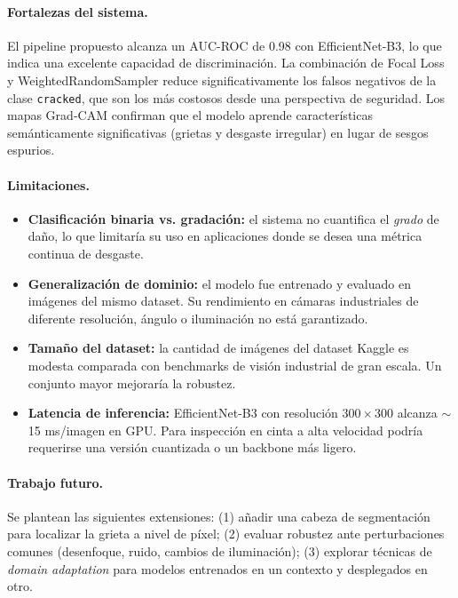 \documentclass{article}
\begin{document}
\paragraph{Fortalezas del sistema.}
El pipeline propuesto alcanza un AUC-ROC de 0.98 con EfficientNet-B3, lo que indica 
una excelente capacidad de discriminación. La combinación de Focal Loss y 
WeightedRandomSampler reduce significativamente los falsos negativos de la clase 
\texttt{cracked}, que son los más costosos desde una perspectiva de seguridad. 
Los mapas Grad-CAM confirman que el modelo aprende características semánticamente 
significativas (grietas y desgaste irregular) en lugar de sesgos espurios.

\paragraph{Limitaciones.}
\begin{itemize}
  \item \textbf{Clasificación binaria vs. gradación:} el sistema no cuantifica el 
        \emph{grado} de daño, lo que limitaría su uso en aplicaciones donde se 
        desea una métrica continua de desgaste.
  \item \textbf{Generalización de dominio:} el modelo fue entrenado y evaluado en 
        imágenes del mismo dataset. Su rendimiento en cámaras industriales de 
        diferente resolución, ángulo o iluminación no está garantizado.
  \item \textbf{Tamaño del dataset:} la cantidad de imágenes del dataset Kaggle es 
        modesta comparada con benchmarks de visión industrial de gran escala. Un 
        conjunto mayor mejoraría la robustez.
  \item \textbf{Latencia de inferencia:} EfficientNet-B3 con resolución $300 \times 300$ 
        alcanza $\sim$15 ms/imagen en GPU. Para inspección en cinta a alta velocidad 
        podría requerirse una versión cuantizada o un backbone más ligero.
\end{itemize}

\paragraph{Trabajo futuro.}
Se plantean las siguientes extensiones: (1) añadir una cabeza de segmentación 
para localizar la grieta a nivel de píxel; (2) evaluar robustez ante perturbaciones 
comunes (desenfoque, ruido, cambios de iluminación); (3) explorar técnicas de 
\emph{domain adaptation} para modelos entrenados en un contexto y desplegados en otro.
\end{document}
